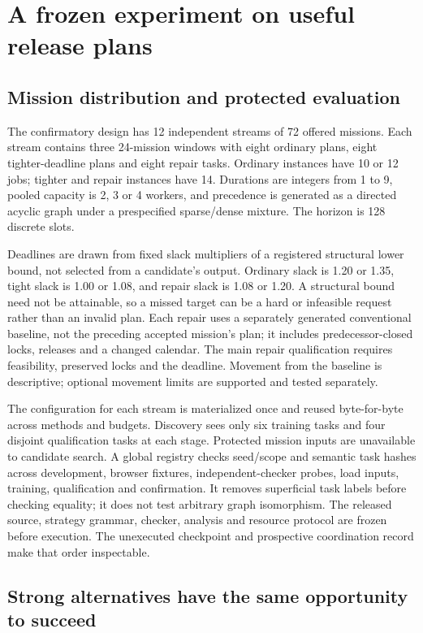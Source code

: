 \section{A frozen experiment on useful release plans}

\subsection{Mission distribution and protected evaluation}

The confirmatory design has 12 independent streams of 72 offered missions. Each stream contains three 24-mission windows with eight ordinary plans, eight tighter-deadline plans and eight repair tasks. Ordinary instances have 10 or 12 jobs; tighter and repair instances have 14. Durations are integers from 1 to 9, pooled capacity is 2, 3 or 4 workers, and precedence is generated as a directed acyclic graph under a prespecified sparse/dense mixture. The horizon is 128 discrete slots.

Deadlines are drawn from fixed slack multipliers of a registered structural lower bound, not selected from a candidate's output. Ordinary slack is 1.20 or 1.35, tight slack is 1.00 or 1.08, and repair slack is 1.08 or 1.20. A structural bound need not be attainable, so a missed target can be a hard or infeasible request rather than an invalid plan. Each repair uses a separately generated conventional baseline, not the preceding accepted mission's plan; it includes predecessor-closed locks, releases and a changed calendar. The main repair qualification requires feasibility, preserved locks and the deadline. Movement from the baseline is descriptive; optional movement limits are supported and tested separately.

The configuration for each stream is materialized once and reused byte-for-byte across methods and budgets. Discovery sees only six training tasks and four disjoint qualification tasks at each stage. Protected mission inputs are unavailable to candidate search. A global registry checks seed/scope and semantic task hashes across development, browser fixtures, independent-checker probes, load inputs, training, qualification and confirmation. It removes superficial task labels before checking equality; it does not test arbitrary graph isomorphism. The released source, strategy grammar, checker, analysis and resource protocol are frozen before execution. The unexecuted checkpoint and prospective coordination record make that order inspectable.

\subsection{Strong alternatives have the same opportunity to succeed}

